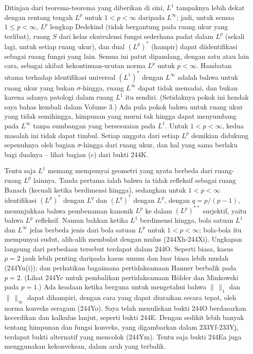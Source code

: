 {Ditinjau dari teorema-teorema yang diberikan di sini, $L^1$ tampaknya
lebih dekat dengan rentang tengah $L^p$ untuk $1<p<\infty$ daripada
$L^{\infty}$; jadi, untuk semua $1\le p<\infty$, $L^p$ lengkap Dedekind
(tidak bergantung pada ruang ukur yang terlibat), ruang $S$ dari kelas
ekuivalensi fungsi sederhana padat dalam $L^p$ (sekali lagi, untuk setiap
ruang ukur), dan dual $(L^p)^*$ (hampir) dapat diidentifikasi sebagai
ruang fungsi yang lain. Semua ini patut dipandang, dengan satu atau lain
cara, sebagai akibat kekontinuan-urutan norma $L^p$ untuk $p<\infty$.
Hambatan utama terhadap identifikasi universal $(L^1)^*$ dengan
$L^{\infty}$ adalah bahwa untuk ruang ukur yang bukan $\sigma$-hingga,
ruang $L^{\infty}$ dapat tidak memadai, dan bukan karena adanya patologi
dalam ruang $L^1$ itu sendiri. (Setidaknya pokok ini hendak saya bahas
kembali dalam Volume 3.) Ada pula pokok bahwa untuk ruang ukur yang tidak
semihingga, himpunan yang murni tak hingga dapat menyumbang pada
$L^{\infty}$ tanpa sumbangan yang bersesuaian pada $L^1$. Untuk
$1<p<\infty$, kedua masalah ini tidak dapat timbul. Setiap anggota dari
setiap $L^p$ demikian didukung sepenuhnya oleh bagian $\sigma$-hingga
dari ruang ukur, dan hal yang sama berlaku bagi dualnya -- lihat bagian
(c) dari bukti 244K.

Tentu saja $L^1$ memang mempunyai geometri yang nyata berbeda dari
ruang-ruang $L^p$ lainnya. Tanda pertama ialah bahwa ia tidak refleksif
sebagai ruang Banach (kecuali ketika berdimensi hingga), sedangkan untuk
$1<p<\infty$ identifikasi $(L^p)^*$ dengan $L^q$ dan $(L^q)^*$ dengan
$L^p$, dengan $q=p/(p-1)$, menunjukkan bahwa pembenaman kanonik $L^p$
ke dalam $(L^p)^{**}$ surjektif, yaitu bahwa $L^p$ refleksif. Namun bahkan
ketika $L^1$ berdimensi hingga, bola satuan $L^1$ dan $L^{\infty}$ jelas
berbeda jenis dari bola satuan $L^p$ untuk $1<p<\infty$; bola-bola itu
mempunyai sudut, alih-alih membulat dengan mulus (244Xh-244Xi).
Ungkapan langsung dari perbedaan tersebut terdapat dalam 244O. Seperti
biasa, kasus $p=2$ jauh lebih penting daripada kasus umum dan luar biasa
lebih mudah (244Yn(i)); dan perhatikan bagaimana pertidaksamaan Hanner
berbalik pada $p=2$. (Lihat 244Yc untuk pembalikan pertidaksamaan
H\"older dan Minkowski pada $p=1$.) Ada keadaan ketika berguna untuk
mengetahui bahwa $\|\,\|_1$ dan $\|\,\|_{\infty}$ dapat dihampiri,
dengan cara yang dapat diuraikan secara tepat, oleh norma konveks seragam
(244Yo). Saya telah menuliskan bukti 244O berdasarkan kecerdikan dan
kalkulus lanjut, seperti bukti 244E. Dengan sedikit lebih banyak tentang
himpunan dan fungsi konveks, yang digambarkan dalam 233Yf-233Yj,
terdapat bukti alternatif yang mencolok (244Ym). Tentu saja bukti 244Ea
juga menggunakan kekonveksan, dalam arah yang terbalik.

}
